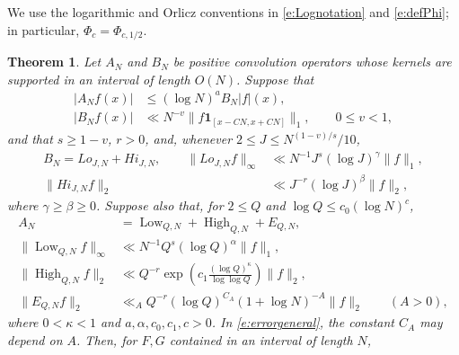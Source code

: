 \documentclass[12pt,reqno]{amsart}
\numberwithin{equation}{section}
\newtheorem{theorem}[equation]{Theorem}
\theoremstyle{definition}
\theoremstyle{remark}
\begin{document}

We use
the logarithmic and Orlicz conventions in \eqref{e:Lognotation} and
\eqref{e:defPhi}; in particular, $\Phi_c=\Phi_{c,1/2}$.

\begin{theorem}\label{t:improvinggeneral}
Let $A_N$ and $B_N$ be positive convolution operators whose kernels are
supported in an interval of length $O(N)$.  Suppose that
\begin{align}
 |A_Nf(x)|&\leq(\log N)^aB_N|f|(x),\label{e:anbnsupbound}\\
 |B_Nf(x)|&\ll N^{-v}\|f\mathbf1_{[x-CN,x+CN]}\|_1,
 \qquad 0\leq v<1,\label{e:bnv}
\end{align}
and that $s\geq1-v$, $r>0$, and, whenever
$2\leq J\leq N^{(1-v)/s}/10$,
\begin{align}
 B_N=Lo_{J,N}+Hi_{J,N},\qquad
 \|Lo_{J,N}f\|_\infty&\ll N^{-1}J^s(\log J)^\gamma\|f\|_1,
 \label{e:lobn1}\\
 \|Hi_{J,N}f\|_2&\ll J^{-r}(\log J)^\beta\|f\|_2,
 \label{e:hibn1}
\end{align}
where $\gamma\geq\beta\geq0$.  Suppose also that, for
$2\leq Q$ and $\log Q\leq c_0(\log N)^c$,
\begin{align}
 A_N&=\operatorname{Low}_{Q,N}+\operatorname{High}_{Q,N}+E_{Q,N},
 \label{e:decompan}\\
 \|\operatorname{Low}_{Q,N}f\|_\infty
 &\ll N^{-1}Q^s(\log Q)^\alpha\|f\|_1,\label{e:lowgeneral}\\
 \|\operatorname{High}_{Q,N}f\|_2
 &\ll Q^{-r}\exp\left(c_1\frac{(\log Q)^\kappa}{\log\log Q}\right)\|f\|_2,
 \label{e:highgeneral}\\
 \|E_{Q,N}f\|_2&\ll_A Q^{-r}(\log Q)^{C_A}
 (1+\log N)^{-A}\|f\|_2
 \qquad(A>0),\label{e:errorgeneral}
\end{align}
where \(0<\kappa<1\) and \(a,\alpha,c_0,c_1,c>0\).  In
\eqref{e:errorgeneral}, the constant \(C_A\) may depend on \(A\).  Then, for
$F,G$ contained in an interval of length $N$,

\end{theorem}
\end{document}
